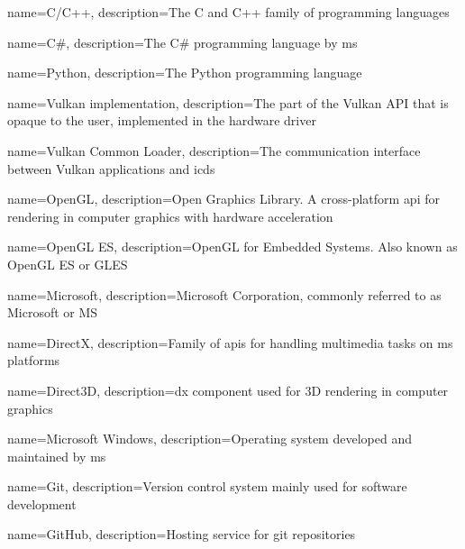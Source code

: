 {
  name={C/C++},
  description={The C and C++ family of programming languages}
}

{
  name={C\#},
  description={The C\# programming language by \gls{ms}}
}

{
  name={Python},
  description={The Python programming language}
}




{
  name={Vulkan implementation},
  description={The part of the Vulkan API that is opaque to the user, implemented in the hardware driver}
}

{
  name={Vulkan Common Loader},
  description={The communication interface between Vulkan applications and \glspl{icd}}
}

{
  name={OpenGL},
  description={Open Graphics Library. A cross-platform \gls{api} for rendering in computer graphics with hardware acceleration}
}

{
  name={OpenGL ES},
  description={OpenGL for Embedded Systems. Also known as OpenGL ES or GLES}
}

{
  name={Microsoft},
  description={Microsoft Corporation, commonly referred to as Microsoft or MS}
}

{
  name={DirectX},
  description={Family of \glspl{api} for handling multimedia tasks on \gls{ms} platforms}
}

{
  name={Direct3D},
  description={\gls{dx} component used for 3D rendering in computer graphics}
}

{
  name={Microsoft Windows},
  description={Operating system developed and maintained by \gls{ms}}
}

{
  name={Git},
  description={Version control system mainly used for software development}
}

{
  name={GitHub},
  description={Hosting service for \gls{git} repositories}
}

